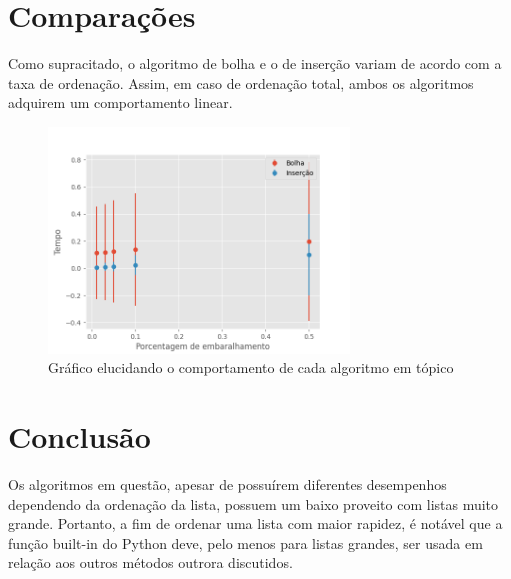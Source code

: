 \documentclass[10pt,a4paper]{article}
\begin{document}
\section{Comparações}
Como supracitado, o algoritmo de bolha e o de inserção variam de acordo com a taxa de ordenação. Assim, em caso de ordenação total, ambos os algoritmos adquirem um comportamento linear.
\begin{figure}[h]
    \includegraphics[width=8cm]{second}
    \caption{Gráfico elucidando o comportamento de cada algoritmo em tópico}
    \end{figure}


\section*{Conclusão}
Os algoritmos em questão, apesar de possuírem diferentes desempenhos dependendo da ordenação da lista, possuem um baixo proveito com listas muito grande. Portanto, a fim de ordenar uma lista com maior rapidez, é notável que a função built-in do Python deve, pelo menos para listas grandes, ser usada em relação aos outros métodos outrora discutidos.
\end{document}
